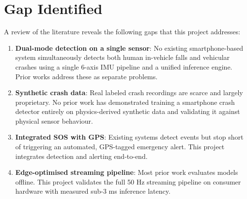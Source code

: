\section{Gap Identified}
\label{sec:gap}

A review of the literature reveals the following gaps that this project addresses:

\begin{enumerate}
    \item \textbf{Dual-mode detection on a single sensor}: No existing smartphone-based system simultaneously detects both human in-vehicle falls and vehicular crashes using a single 6-axis IMU pipeline and a unified inference engine. Prior works address these as separate problems.
    \item \textbf{Synthetic crash data}: Real labeled crash recordings are scarce and largely proprietary. No prior work has demonstrated training a smartphone crash detector entirely on physics-derived synthetic data and validating it against physical sensor behaviour.
    \item \textbf{Integrated SOS with GPS}: Existing systems detect events but stop short of triggering an automated, GPS-tagged emergency alert. This project integrates detection and alerting end-to-end.
    \item \textbf{Edge-optimised streaming pipeline}: Most prior work evaluates models offline. This project validates the full 50 Hz streaming pipeline on consumer hardware with measured sub-3 ms inference latency.
\end{enumerate}
